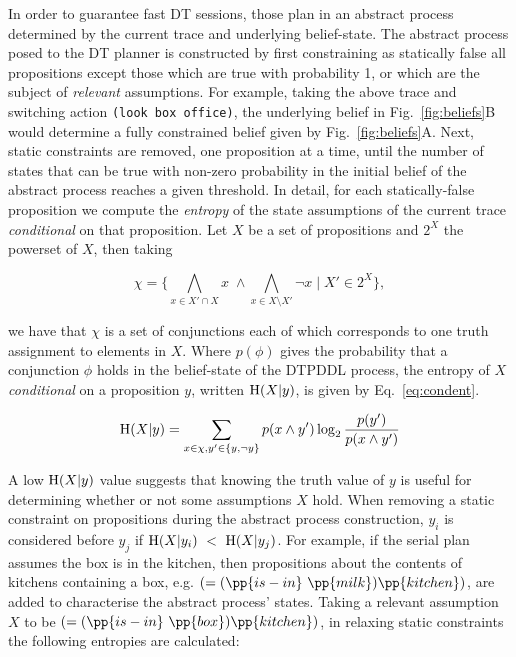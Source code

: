 In order to guarantee fast DT sessions, those plan in an abstract
process determined by the current trace and underlying belief-state.
The abstract process posed to the DT planner is constructed by first
constraining as statically false all propositions except those which
are true with probability 1, or which are the subject of {\em
  relevant} assumptions. For example, taking the above trace and
switching action {\texttt \mbox{(look~box~office)}}, the underlying
belief in Fig.~\ref{fig:beliefs}B would determine a fully constrained
belief given by Fig.~\ref{fig:beliefs}A.  Next, static constraints are
removed, one proposition at a time, until the number of states that
can be true with non-zero probability in the initial belief of the
abstract process reaches a given threshold.  In detail, for each
statically-false proposition we compute the {\em entropy} of the state
assumptions of the current trace {\em conditional} on that
proposition.  Let $X$ be a set of propositions and $2^X$ the powerset
of $X$, then taking



\small
\[
\chi = \{\bigwedge_{x \in X'
  \cap X}x \; \land \bigwedge_{x \in X \setminus X'}\neg x \;|\; X' \in 2^X\},
\]
\normalsize

\noindent we have that $\chi$ is a set of conjunctions each of which
corresponds to one truth assignment to elements in $X$. Where
$p(\phi)$ gives the probability that a conjunction $\phi$ holds in the
belief-state of the DTPDDL process, the entropy of $X$
\emph{conditional} on a proposition $y$, written $\entropy(X|y)$, is
given by Eq.~\ref{eq:condent}.

\vspace{-1ex}
\small
\begin{equation}\label{eq:condent}
  \entropy(X|y) = \sum_{x \in \chi, y' \in \{y, \neg y\}} p(x \land y') \log_2
  \frac{p(y')}{p(x \land y')}
\end{equation}
\normalsize

A low $\entropy(X|y)$ value suggests that knowing the truth value of
$y$ is useful for determining whether or not some assumptions $X$
hold. When removing a static constraint on propositions during the
abstract process construction, $y_i$ is considered before $y_j$ if
$\entropy(X|y_i)~<~\entropy(X|y_j)$. For example, if the serial plan
assumes the box is in the kitchen, then propositions about the
contents of kitchens containing a box,
e.g. $(=(\pp{is-in}~\pp{milk})\pp{kitchen})$, are added to
characterise the abstract process' states. Taking a relevant
assumption $X$ to be $(=(\pp{is-in}~\pp{box})\pp{kitchen})$, in
relaxing static constraints the following entropies are calculated:

